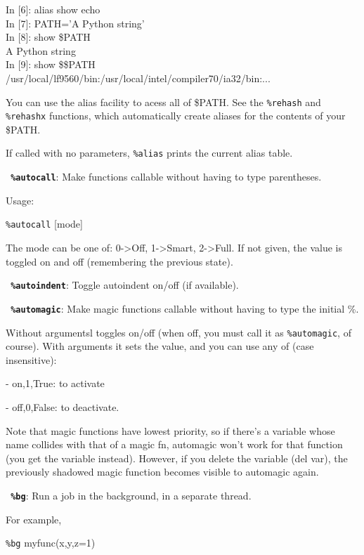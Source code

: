         In [6]: alias show echo\\
        In [7]: PATH='A Python string'\\
        In [8]: show \$PATH\\
        A Python string\\
        In [9]: show \$\$PATH\\
        /usr/local/lf9560/bin:/usr/local/intel/compiler70/ia32/bin:...

        You can use the alias facility to acess all of \$PATH.  See the \texttt{\%rehash}
        and \texttt{\%rehashx} functions, which automatically create aliases for the
        contents of your \$PATH.

        If called with no parameters, \texttt{\%alias} prints the current alias table.

\bigskip
\texttt{\textbf{ \%autocall}}:
	Make functions callable without having to type parentheses.

        Usage:

           \texttt{\%autocall} [mode]

        The mode can be one of: 0->Off, 1->Smart, 2->Full.  If not given, the
        value is toggled on and off (remembering the previous state).

\bigskip
\texttt{\textbf{ \%autoindent}}:
	Toggle autoindent on/off (if available).

\bigskip
\texttt{\textbf{ \%automagic}}:
	Make magic functions callable without having to type the initial \%.
        
        Without argumentsl toggles on/off (when off, you must call it as
        \texttt{\%automagic}, of course).  With arguments it sets the value, and you can
        use any of (case insensitive):

         - on,1,True: to activate
         
         - off,0,False: to deactivate.

        Note that magic functions have lowest priority, so if there's a
        variable whose name collides with that of a magic fn, automagic won't
        work for that function (you get the variable instead). However, if you
        delete the variable (del var), the previously shadowed magic function
        becomes visible to automagic again.

\bigskip
\texttt{\textbf{ \%bg}}:
	Run a job in the background, in a separate thread.

        For example,

          \texttt{\%bg} myfunc(x,y,z=1)

